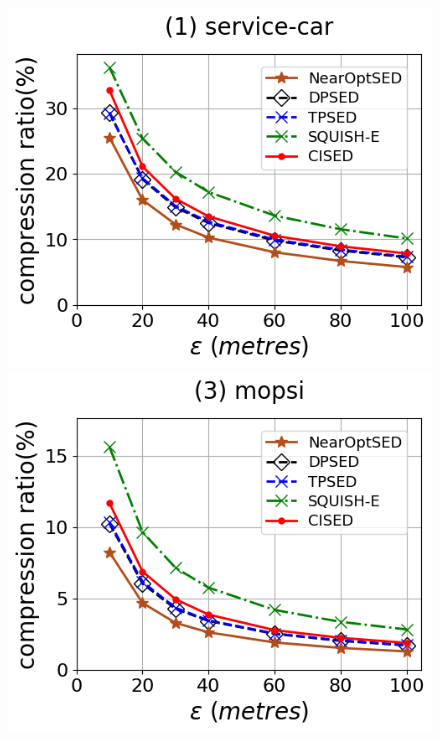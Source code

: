 \begin{figure}[tb!]
	\centering
	\includegraphics[scale=0.315]{Figures/Exp-CR-epsilon-service.png} 	\hspace{1ex}
	\includegraphics[scale=0.315]{Figures/Exp-CR-epsilon-mopsi.png}		\hspace{1ex}

\end{figure}

